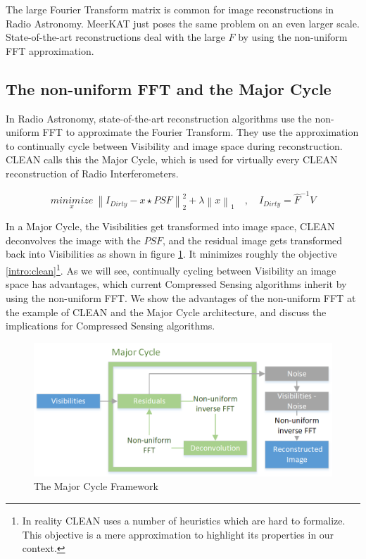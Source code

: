 The large Fourier Transform matrix is common for image reconstructions in Radio Astronomy. MeerKAT just poses the same problem on an even larger scale.
State-of-the-art reconstructions deal with the large $F$ by using the non-uniform FFT approximation.

\subsection{The non-uniform FFT and the Major Cycle}\label{intro:nufft}
In Radio Astronomy, state-of-the-art reconstruction algorithms use the non-uniform FFT to approximate the Fourier Transform. They use the approximation to continually cycle between Visibility and image space during reconstruction. CLEAN calls this the Major Cycle, which is used for virtually every CLEAN reconstruction of Radio Interferometers. 

\begin{equation}\label{intro:clean}
\underset{x}{minimize} \: \left \|  I_{Dirty} - x \star PSF \right \|_2^2 + \lambda \left \| x \right \|_1 \quad, \quad I_{Dirty} = \hat{F}^{-1} V
\end{equation}

In a Major Cycle, the Visibilities get transformed into image space, CLEAN deconvolves the image with the $PSF$, and the residual image gets transformed back into Visibilities as shown in figure \ref{intro:major}. It minimizes roughly the objective \eqref{intro:clean}\footnote{ In reality CLEAN uses a number of heuristics which are hard to formalize. This objective is a mere approximation to highlight its properties in our context.}. As we will see, continually cycling between Visibility an image space has advantages, which current Compressed Sensing algorithms inherit by using the non-uniform FFT. We show the advantages of the non-uniform FFT at the example of CLEAN and the Major Cycle architecture, and discuss the implications for Compressed Sensing algorithms.


\begin{figure}[h]
	\centering
	\includegraphics[width=0.80\linewidth]{./chapters/01.intro/Major-Minor.png}
	\caption{The Major Cycle Framework}
	\label{intro:major}
\end{figure}

